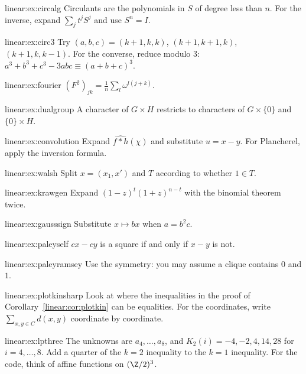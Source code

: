 \begin{hint}{linear:ex:circalg}
Circulants are the polynomials in $S$ of degree less than $n$. For the inverse, expand $\sum_jt^jS^j$ and use $S^n=I$.
\end{hint}
\begin{hint}{linear:ex:circ3}
Try $(a,b,c)=(k+1,k,k)$, $(k+1,k+1,k)$, $(k+1,k,k-1)$. For the converse, reduce modulo $3$: $a^3+b^3+c^3-3abc\equiv(a+b+c)^3$.
\end{hint}
\begin{hint}{linear:ex:fourier}
$(F^2)_{jk}=\frac1n\sum_l\omega^{l(j+k)}$.
\end{hint}
\begin{hint}{linear:ex:dualgroup}
A character of $G\times H$ restricts to characters of $G\times\{0\}$ and $\{0\}\times H$.
\end{hint}
\begin{hint}{linear:ex:convolution}
Expand $\widehat{f*h}(\chi)$ and substitute $u=x-y$. For Plancherel, apply the inversion formula.
\end{hint}
\begin{hint}{linear:ex:walsh}
Split $x=(x_1,x')$ and $T$ according to whether $1\in T$.
\end{hint}
\begin{hint}{linear:ex:krawgen}
Expand $(1-z)^t(1+z)^{n-t}$ with the binomial theorem twice.
\end{hint}
\begin{hint}{linear:ex:gausssign}
Substitute $x\mapsto bx$ when $a=b^2c$.
\end{hint}
\begin{hint}{linear:ex:paleyself}
$cx-cy$ is a square if and only if $x-y$ is not.
\end{hint}
\begin{hint}{linear:ex:paleyramsey}
Use the symmetry: you may assume a clique contains $0$ and $1$.
\end{hint}
\begin{hint}{linear:ex:plotkinsharp}
Look at where the inequalities in the proof of Corollary~\ref{linear:cor:plotkin} can be equalities. For the coordinates, write
$\sum_{x,y\in C}d(x,y)$ coordinate by coordinate.
\end{hint}
\begin{hint}{linear:ex:lpthree}
The unknowns are $a_4,\dots,a_8$, and $K_2(i)=-4,-2,4,14,28$ for $i=4,\dots,8$. Add a quarter of the $k=2$ inequality to the
$k=1$ inequality. For the code, think of affine functions on $(\Z/2)^3$.
\end{hint}

